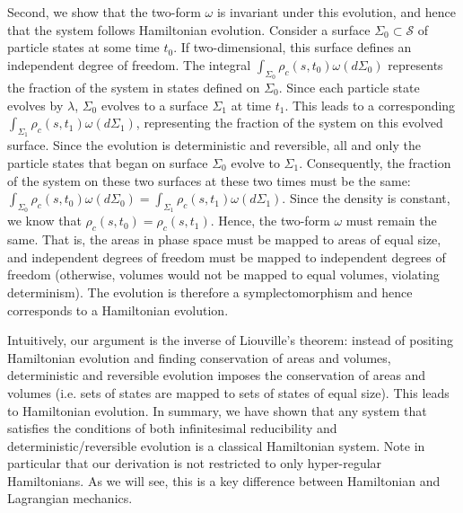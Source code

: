 \documentclass[12pt, twoside]{article}
\begin{document}
Second, we show that the two-form $\omega$ is invariant under this evolution, and hence that the system follows Hamiltonian evolution. Consider a surface $\Sigma_0 \subset \mathcal{S}$ of particle states at some time $t_0$. If two-dimensional, this surface defines an independent degree of freedom. The integral $\int_{\Sigma_0} \rho_c (s, t_0) \omega(d\Sigma_0)$ represents the fraction of the system in states defined on $\Sigma_0$. Since each particle state evolves by $\lambda$, $\Sigma_0$ evolves to a surface $\Sigma_1$ at time $t_1$. This leads to a corresponding $\int_{\Sigma_1} \rho_c (s, t_1) \omega(d\Sigma_1)$, representing the fraction of the system on this evolved surface. Since the evolution is deterministic and reversible, all and only the particle states that began on surface  $\Sigma_0$ evolve to $\Sigma_1$. Consequently, the fraction of the system on these two surfaces at these two times must be the same: $\int_{\Sigma_0} \rho_c (s, t_0) \omega(d\Sigma_0) = \int_{\Sigma_1} \rho_c (s, t_1) \omega(d\Sigma_1)$. Since the density is constant, we know that $\rho_c (s, t_0) = \rho_c (s, t_1)$. Hence, the two-form $\omega$ must remain the same. That is, the areas in phase space must be mapped to areas of equal size, and independent degrees of freedom must be mapped to independent degrees of freedom (otherwise, volumes would not be mapped to equal volumes, violating determinism). The evolution is therefore a symplectomorphism and hence corresponds to a Hamiltonian evolution. 

Intuitively, our argument is the inverse of Liouville's theorem: instead of positing Hamiltonian evolution and finding conservation of areas and volumes, deterministic and reversible evolution imposes the conservation of areas and volumes (i.e. sets of states are mapped to sets of states of equal size). This leads to Hamiltonian evolution. In summary, we have shown that any system that satisfies the conditions of both infinitesimal reducibility and deterministic/reversible evolution is a classical Hamiltonian system. {\color{green} Note in particular that our derivation is not restricted to only hyper-regular Hamiltonians. As we will see, this is a key difference between Hamiltonian and Lagrangian mechanics.}
\end{document}

